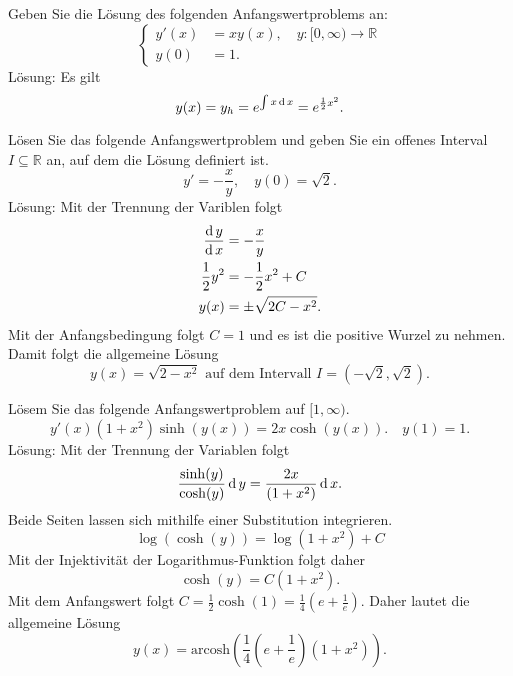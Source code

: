 Geben Sie die Lösung des folgenden Anfangswertproblems an:
\begin{displaymath}
  \begin{cases}
    y'(x) &= xy(x), \quad y : [0,\infty) \to \mathbb{R}\\
    y(0) &= 1.
  \end{cases}
\end{displaymath}
Lösung:
Es gilt
\begin{displaymath}
  y(x) = y_h = e^{\int x \operatorname{\mathop{}\!\mathrm{d}} x} = e^{\frac{1}{2} x^2}.  
\end{displaymath}

Lösen Sie das folgende Anfangswertproblem und geben Sie ein offenes Interval $I \subseteq \mathbb{R}$ an, auf dem die Lösung definiert ist.
\begin{displaymath}
  y' = -\frac{x}{y}, \quad y(0) = \sqrt{2}.
\end{displaymath}
Lösung:
Mit der Trennung der Variblen folgt
\begin{align*}
  \frac{\operatorname{\mathop{}\!\mathrm{d}} y}{\operatorname{\mathop{}\!\mathrm{d}} x} &= -\frac{x}{y}\\
  \frac{1}{2}y^2 &= -\frac{1}{2} x^2 + C\\
  y(x) &= \pm \sqrt{2C - x^2}.
\end{align*}
Mit der Anfangsbedingung folgt $C = 1$ und es ist die positive Wurzel zu nehmen.
Damit folgt die allgemeine Lösung
\begin{displaymath}
  y(x) = \sqrt{2 - x^2} \text{ auf dem Intervall } I = (-\sqrt{2}, \sqrt{2}).
\end{displaymath}

Lösem Sie das folgende Anfangswertproblem auf $[1, \infty)$.
\begin{displaymath}
  y'(x)(1 + x^2) \sinh(y(x)) = 2x \cosh(y(x)). \quad y(1) = 1.
\end{displaymath}
Lösung: Mit der Trennung der Variablen folgt
\begin{displaymath}
  \frac{\sinh(y)}{\cosh(y)} \operatorname{\mathop{}\!\mathrm{d}} y = \frac{2x}{(1 + x^2)} \operatorname{\mathop{}\!\mathrm{d}} x.
\end{displaymath}
Beide Seiten lassen sich mithilfe einer Substitution integrieren.
\begin{displaymath}
  \log(\cosh(y)) = \log(1 + x^2) + C
\end{displaymath}
Mit der Injektivität der Logarithmus-Funktion folgt daher
\begin{displaymath}
  \cosh(y) = C(1 + x^2).
\end{displaymath}
Mit dem Anfangswert folgt $C = \frac{1}{2} \cosh(1) = \frac{1}{4}\left(e + \frac{1}{e}\right)$.
Daher lautet die allgemeine Lösung
\begin{displaymath}
  y(x) = \text{arcosh}\left(\frac{1}{4}(e + \frac{1}{e})(1 + x^2)\right).
\end{displaymath}

